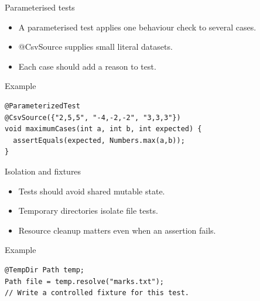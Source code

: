 \documentclass[10pt,aspectratio=169]{beamer}
\begin{document}
\begin{frame}[fragile,t]{Parameterised tests}
\begin{itemize}
\item A parameterised test applies one behaviour check to several cases.
\item @CsvSource supplies small literal datasets.
\item Each case should add a reason to test.
\end{itemize}
\vspace{1mm}\begin{block}{Example}
\begin{lstlisting}
@ParameterizedTest
@CsvSource({"2,5,5", "-4,-2,-2", "3,3,3"})
void maximumCases(int a, int b, int expected) {
  assertEquals(expected, Numbers.max(a,b));
}
\end{lstlisting}
\end{block}
\end{frame}

\begin{frame}[fragile,t]{Isolation and fixtures}
\begin{itemize}
\item Tests should avoid shared mutable state.
\item Temporary directories isolate file tests.
\item Resource cleanup matters even when an assertion fails.
\end{itemize}
\vspace{1mm}\begin{block}{Example}
\begin{lstlisting}
@TempDir Path temp;
Path file = temp.resolve("marks.txt");
// Write a controlled fixture for this test.
\end{lstlisting}
\end{block}
\end{frame}
\end{document}
